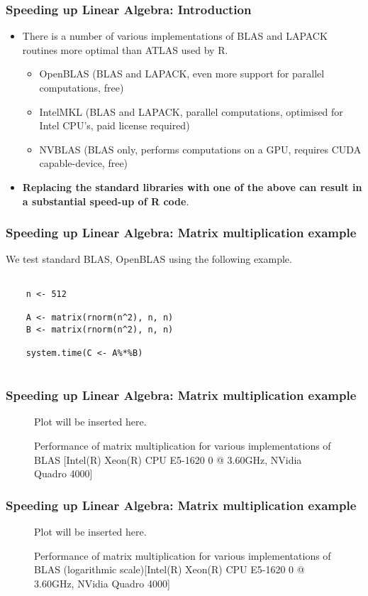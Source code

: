 \documentclass[handout]{beamer}
\newif\ifplot
\newcommand{\tikzfigure}[2]{

	\begin{figure}[h!]
		\ifplot  	
			\resizebox{0.9\textwidth}{!}{}
		\else
			Plot will be inserted here.
		\fi		
		\caption{#2}
	\end{figure} 
}
\begin{document}
\begin{frame}
	\frametitle{Speeding up Linear Algebra: Introduction}
	
	\begin{itemize}
		\item There is a number of various implementations of BLAS and LAPACK routines more optimal than ATLAS used by R.
		\begin{itemize}
			\item OpenBLAS (BLAS and LAPACK, even more support for parallel computations, free)
			\item IntelMKL (BLAS and LAPACK, parallel computations, optimised for Intel CPU's, paid license required)
			\item NVBLAS (BLAS only, performs computations on a GPU, requires CUDA capable-device, free)
		\end{itemize}
		\item \textbf{Replacing the standard libraries with one of the above can result in a substantial speed-up of R code}.
	\end{itemize}
\end{frame}

\begin{frame}[fragile]
	\frametitle{Speeding up Linear Algebra: Matrix multiplication example}
We test standard BLAS, OpenBLAS  using the following example.
\begin{Verbatim}[fontsize=\footnotesize]

    n <- 512
    
    A <- matrix(rnorm(n^2), n, n)
    B <- matrix(rnorm(n^2), n, n)
    
    system.time(C <- A%*%B)
    
\end{Verbatim}

\end{frame}


\begin{frame}
	\frametitle{Speeding up Linear Algebra: Matrix multiplication example}
		\tikzfigure{matrix_multiplciations_normalscale}{Performance of matrix multiplication for various implementations of BLAS [Intel(R) Xeon(R) CPU E5-1620 0 @ 3.60GHz, NVidia Quadro 4000]}
\end{frame}

\begin{frame}
	\frametitle{Speeding up Linear Algebra: Matrix multiplication example}
		\tikzfigure{matrix_multiplciations_logscale}{Performance of matrix multiplication for various implementations of BLAS (logarithmic scale)[Intel(R) Xeon(R) CPU E5-1620 0 @ 3.60GHz, NVidia Quadro 4000]}
\end{frame}
\end{document}

